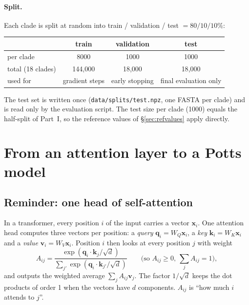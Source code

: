 \paragraph{Split.} Each clade is split at random into train / validation / test $=80/10/10\%$:
\begin{center}
\begin{tabular}{lccc}
\toprule
 & train & validation & test\\
\midrule
per clade & 8000 & 1000 & 1000\\
total (18 clades) & 144{,}000 & 18{,}000 & 18{,}000\\
used for & gradient steps & early stopping & final evaluation only\\
\bottomrule
\end{tabular}
\end{center}
The test set is written once (\texttt{data/splits/test.npz}, one FASTA per clade) and is read only
by the evaluation script. The test size per clade (1000) equals the half-split of Part~I, so the reference
values of \S\ref{sec:refvalues} apply directly.

\section{From an attention layer to a Potts model}\label{sec:fa}
\subsection{Reminder: one head of self-attention}
In a transformer, every position $i$ of the input carries a vector $\bm x_i$. One attention head computes
three vectors per position: a \emph{query} $\bm q_i=W_Q\bm x_i$, a \emph{key} $\bm k_i=W_K\bm x_i$ and a
\emph{value} $\bm v_i=W_V\bm x_i$. Position $i$ then looks at every position $j$ with weight
\[
A_{ij}=\frac{\exp(\bm q_i\cdot\bm k_j/\sqrt d)}{\sum_{j'}\exp(\bm q_i\cdot\bm k_{j'}/\sqrt d)}
\qquad\Big(\text{so } A_{ij}\ge0,\ \textstyle\sum_jA_{ij}=1\Big),
\]
and outputs the weighted average $\sum_jA_{ij}\bm v_j$. The factor $1/\sqrt d$ keeps the dot products of
order 1 when the vectors have $d$ components. $A_{ij}$ is ``how much $i$ attends to $j$''.

